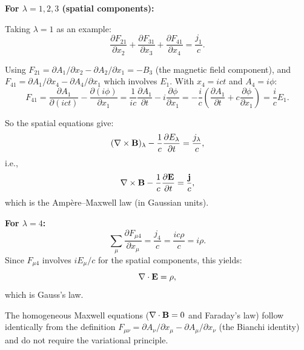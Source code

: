 \documentclass[12pt]{article}
\begin{document}
\noindent\textbf{For $\lambda = 1,2,3$ (spatial components):}

Taking $\lambda = 1$ as an example:
\[
  \frac{\partial F_{21}}{\partial x_2} + \frac{\partial F_{31}}{\partial x_3} + \frac{\partial F_{41}}{\partial x_4} = \frac{j_1}{c}.
\]

Using $F_{21} = \partial A_1/\partial x_2 - \partial A_2/\partial x_1 = -B_3$ (the magnetic field component), and $F_{41} = \partial A_1/\partial x_4 - \partial A_4/\partial x_1$ which involves $E_1$. With $x_4 = ict$ and $A_4 = i\phi$:
\[
  F_{41} = \frac{\partial A_1}{\partial(ict)} - \frac{\partial(i\phi)}{\partial x_1} = \frac{1}{ic}\frac{\partial A_1}{\partial t} - i\frac{\partial\phi}{\partial x_1} = -\frac{i}{c}\left(\frac{\partial A_1}{\partial t} + c\frac{\partial\phi}{\partial x_1}\right) = \frac{i}{c}E_1.
\]

So the spatial equations give:
\[
  (\nabla\times{\bf B})_\lambda - \frac{1}{c}\frac{\partial E_\lambda}{\partial t} = \frac{j_\lambda}{c},
\]
i.e.,
\[
  \nabla\times{\bf B} - \frac{1}{c}\frac{\partial{\bf E}}{\partial t} = \frac{{\bf j}}{c},
\]
which is the Amp\`ere--Maxwell law (in Gaussian units).

\medskip
\noindent\textbf{For $\lambda = 4$:}
\[
  \sum_\mu \frac{\partial F_{\mu 4}}{\partial x_\mu} = \frac{j_4}{c} = \frac{ic\rho}{c} = i\rho.
\]
Since $F_{\mu 4}$ involves $iE_\mu/c$ for the spatial components, this yields:
\[
  \nabla\cdot{\bf E} = \rho,
\]
which is Gauss's law.

\medskip
The homogeneous Maxwell equations ($\nabla\cdot{\bf B}=0$ and Faraday's law) follow identically from the definition $F_{\mu\nu} = \partial A_\nu/\partial x_\mu - \partial A_\mu/\partial x_\nu$ (the Bianchi identity) and do not require the variational principle.
\end{document}
